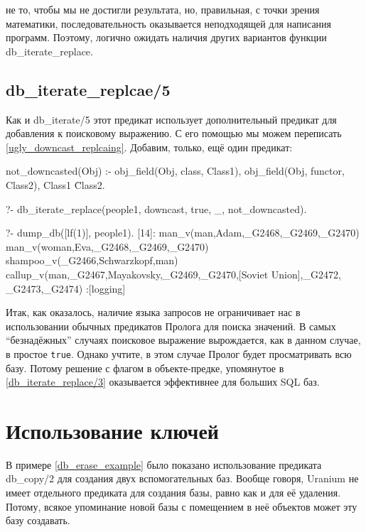 \documentclass[a4paper]{book}
\def\ur{Uranium}
\begin{document}
не то, чтобы мы не достигли результата, но, правильная, с точки
зрения математики, последовательность оказывается неподходящей
для написания программ. Поэтому, логично ожидать наличия других
вариантов функции db_iterate_replace.

\subsection{db_iterate_replcae/5}

Как и db_iterate/5 этот предикат использует дополнительный
предикат для добавления к поисковому выражению. С его помощью мы
можем переписать \ref{ugly_downcast_replcaing}. Добавим, только,
ещё один предикат:

\begin{example}{}{}
not_downcasted(Obj) :- 
   obj_field(Obj, class, Class1),
   obj_field(Obj, functor, Class2),
   Class1 \= Class2.
\end{example}

\begin{example}{}{}
?- db_iterate_replace(people1, downcast, true, _, not_downcasted).

?- dump_db([lf(1)], people1).
[14]: man_v(man,Adam,_G2468,_G2469,_G2470) 
man_v(woman,Eva,_G2468,_G2469,_G2470) 
shampoo_v(_G2466,Schwarzkopf,man) 
callup_v(man,_G2467,Mayakovsky,_G2469,_G2470,[Soviet Union],_G2472,
_G2473,_G2474)                                                    
 :[logging]
\end{example}

Итак, как оказалось, наличие языка запросов не ограничивает нас в
использовании обычных предикатов Пролога для поиска значений. В
самых ``безнадёжных'' случаях поисковое выражение вырождается,
как в данном случае, в простое \verb|true|. Однако учтите, в этом
случае Пролог будет просматривать всю базу. Потому решение с
флагом в объекте-предке, упомянутое в \ref{db_iterate_replace/3}
оказывается эффективнее для больших SQL баз.

\section{Использование ключей}
\label{keys}

В примере \ref{db_erase_example} было показано использование
предиката db\_copy/2 для создания двух вспомогательных
баз. Вообще говоря, \ur{} не имеет отдельного предиката для
создания базы, равно как и для её удаления. Потому, всякое
упоминание новой базы с помещением в неё объектов может эту базу
создавать. 
\end{document}
